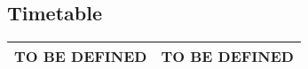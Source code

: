 

\newslide
\subsection*{Timetable}
\begin{tabularx}{\linewidth}{|l|X|}
\hline
TO BE DEFINED & TO BE DEFINED\\
\hline
\end{tabularx}
%
